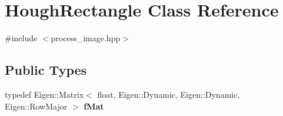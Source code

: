 \hypertarget{class_hough_rectangle}{}\section{Hough\+Rectangle Class Reference}
\label{class_hough_rectangle}


{\ttfamily \#include $<$process\+\_\+image.\+hpp$>$}

\subsection*{Public Types}
\begin{DoxyCompactItemize}
\item 
\mbox{\label{class_hough_rectangle_a0cd25532f8e21e7716dc8e1aac2568b8}} 
typedef Eigen\+::\+Matrix$<$ float, Eigen\+::\+Dynamic, Eigen\+::\+Dynamic, Eigen\+::\+Row\+Major $>$ {\bfseries f\+Mat}
\end{DoxyCompactItemize}
